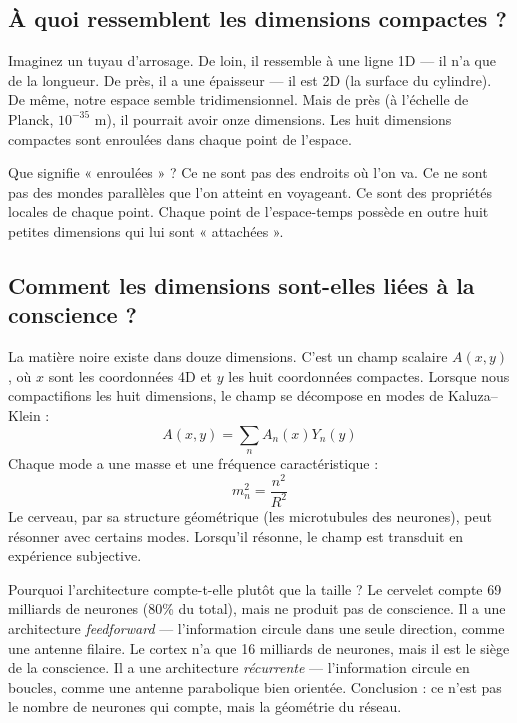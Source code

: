 \subsection{À quoi ressemblent les dimensions compactes ?}
Imaginez un tuyau d'arrosage. De loin, il ressemble à une ligne 1D --- il n'a que de la longueur. De près, il a une épaisseur --- il est 2D (la surface du cylindre). De même, notre espace semble tridimensionnel. Mais de près (à l'échelle de Planck, $10^{-35}$ m), il pourrait avoir onze dimensions. Les huit dimensions compactes sont enroulées dans chaque point de l'espace.

Que signifie « enroulées » ? Ce ne sont pas des endroits où l'on va. Ce ne sont pas des mondes parallèles que l'on atteint en voyageant. Ce sont des propriétés locales de chaque point. Chaque point de l'espace-temps possède en outre huit petites dimensions qui lui sont « attachées ».

\subsection{Comment les dimensions sont-elles liées à la conscience ?}
La matière noire existe dans douze dimensions. C'est un champ scalaire $A(x,y)$, où $x$ sont les coordonnées 4D et $y$ les huit coordonnées compactes. Lorsque nous compactifions les huit dimensions, le champ se décompose en modes de Kaluza--Klein :
\begin{equation}
A(x,y) = \sum_n A_n(x) Y_n(y)
\end{equation}
Chaque mode a une masse et une fréquence caractéristique :
\begin{equation}
m_n^2 = \frac{n^2}{R^2}
\end{equation}
Le cerveau, par sa structure géométrique (les microtubules des neurones), peut résonner avec certains modes. Lorsqu'il résonne, le champ est transduit en expérience subjective.

Pourquoi l'architecture compte-t-elle plutôt que la taille ? Le cervelet compte 69 milliards de neurones (80\% du total), mais ne produit pas de conscience. Il a une architecture \textit{feedforward} --- l'information circule dans une seule direction, comme une antenne filaire. Le cortex n'a que 16 milliards de neurones, mais il est le siège de la conscience. Il a une architecture \textit{récurrente} --- l'information circule en boucles, comme une antenne parabolique bien orientée. Conclusion : ce n'est pas le nombre de neurones qui compte, mais la géométrie du réseau.

